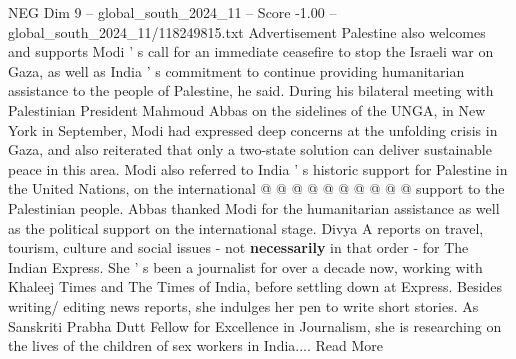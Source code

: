 \begin{textsample}{NEG Dim 9 – global\_south\_2024\_11 – Score -1.00 – global\_south\_2024\_11/118249815.txt}
Advertisement Palestine also welcomes and supports Modi ' s call for an immediate ceasefire to stop the Israeli war on Gaza, as well as India ' s commitment to continue providing humanitarian assistance to the people of Palestine, he said.
During his bilateral meeting with Palestinian President Mahmoud Abbas on the sidelines of the UNGA, in New York in September, Modi had expressed deep concerns at the unfolding crisis in Gaza, and also reiterated that only a two-state solution can deliver sustainable peace in this area.
Modi also referred to India ' s historic support for Palestine in the United Nations, on the international @ @ @ @ @ @ @ @ @ @ support to the Palestinian people.
Abbas thanked Modi for the humanitarian assistance as well as the political support on the international stage.
Divya A reports on travel, tourism, culture and social issues - not \textbf{necessarily} in that order - for The Indian Express.
She ' s been a journalist for over a decade now, working with Khaleej Times and The Times of India, before settling down at Express.
Besides writing/ editing news reports, she indulges her pen to write short stories.
As Sanskriti Prabha Dutt Fellow for Excellence in Journalism, she is researching on the lives of the children of sex workers in India....
Read More

\end{textsample}

